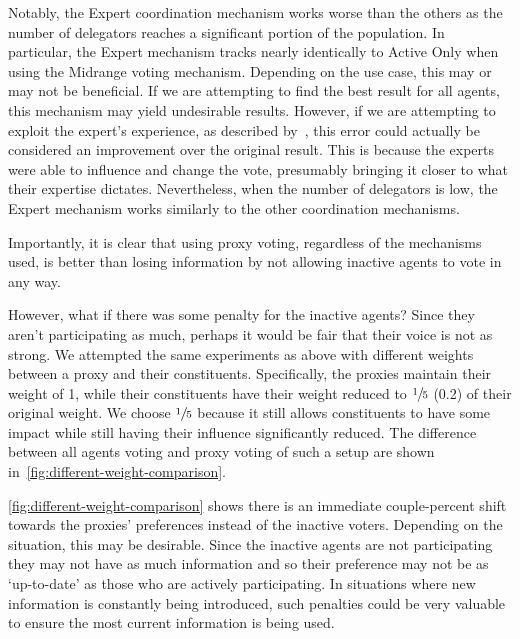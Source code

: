 Notably, the Expert coordination mechanism works worse than the others as the number
of delegators reaches a significant portion of the population.
In particular, the Expert mechanism tracks nearly identically to Active Only when
using the Midrange voting mechanism.
Depending on the use case, this may or may not be beneficial.
If we are attempting to find the best result for all agents, this mechanism may yield
undesirable results.
However, if we are attempting to exploit the expert's experience, as described
by~\cite{Miller1969}, this error could actually be considered an improvement over
the original result.
This is because the experts were able to influence and change the vote, presumably
bringing it closer to what their expertise dictates.
Nevertheless, when the number of delegators is low, the Expert mechanism works
similarly to the other coordination mechanisms.

Importantly, it is clear that using proxy voting, regardless of the mechanisms used,
is better than losing information by not allowing inactive agents to vote in any way.

However, what if there was some penalty for the inactive agents?
Since they aren't participating as much, perhaps it would be fair that their voice is
not as strong.
We attempted the same experiments as above with different weights between a proxy and
their constituents.
Specifically, the proxies maintain their weight of 1, while their constituents have
their weight reduced to $\sfrac{1}{5}$ (0.2) of their original weight.
We choose $\sfrac{1}{5}$ because it still allows constituents to have some impact
while still having their influence significantly reduced.
The difference between all agents voting and proxy voting of such a setup are shown
in~\autoref{fig:different-weight-comparison}.

\autoref{fig:different-weight-comparison}
shows there is an immediate couple-percent shift towards the proxies' preferences
instead of the inactive voters.
Depending on the situation, this may be desirable.
Since the inactive agents are not participating they may not have as much information
and so their preference may not be as `up-to-date' as those who are actively
participating.
In situations where new information is constantly being introduced, such penalties
could be very valuable to ensure the most current information is being used.

